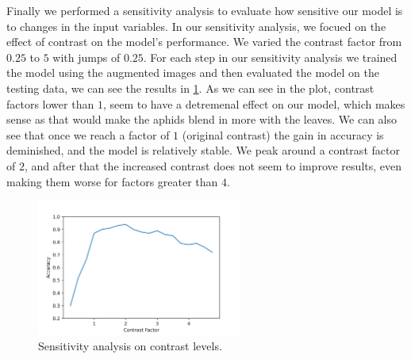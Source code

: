 \documentclass{article}
\begin{document}


Finally we performed a sensitivity analysis to evaluate how sensitive our model is to changes in the input variables. In our sensitivity analysis, 
we focued on the effect of contrast on the model’s performance.
We varied the contrast factor from \(0.25\) to \(5\) with jumps of \(0.25\).
For each step in our sensitivity analysis we trained the model using the augmented images and then evaluated the model
on the testing data, we can see the results in \ref*{fig:sensitivity}.
As we can see in the plot, contrast factors lower than \(1\), seem to have a detremenal effect on our model, which makes
sense as that would make the aphids blend in more with the leaves.
We can also see that once we reach a factor of \(1\) (original contrast) the gain in accuracy is deminished, and the 
model is relatively stable. We peak around a contrast factor of \(2\), and after that the increased contrast does not seem
to improve results, even making them worse for factors greater than \(4\).

\begin{figure}[h]
    \centering
    \includegraphics[width=0.6\textwidth]{images/sensitivity.png}
    \caption{Sensitivity analysis on contrast levels.}
    \label{fig:sensitivity}
\end{figure}
\end{document}
